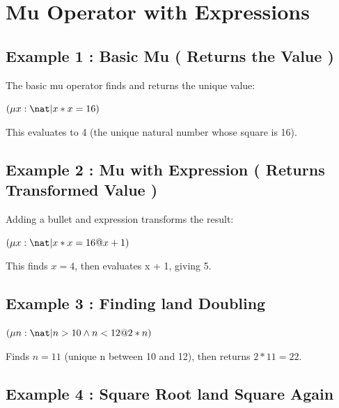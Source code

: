 \documentclass[a4paper,10pt,fleqn]{article}
\begin{document}
\section*{Mu Operator with Expressions}

\subsection*{Example 1 : Basic Mu ( Returns the Value )}

\noindent The basic mu operator finds and returns the unique value:

\bigskip

\noindent
$(\mu x : \nat | x * x = 16)$


\noindent This evaluates to 4 (the unique natural number whose square is 16).

\bigskip

\subsection*{Example 2 : Mu with Expression ( Returns Transformed Value )}

\noindent Adding a bullet and expression transforms the result:

\bigskip

\noindent
$(\mu x : \nat | x * x = 16 @ x + 1)$


\noindent This finds $x = 4$, then evaluates x + 1, giving 5.

\bigskip

\subsection*{Example 3 : Finding land Doubling}

\noindent
$(\mu n : \nat | n > 10 \land n < 12 @ 2 * n)$


\noindent Finds $n = 11$ (unique n between 10 and 12), then returns $2 * 11 = 22$.

\bigskip

\subsection*{Example 4 : Square Root land Square Again}
\end{document}
